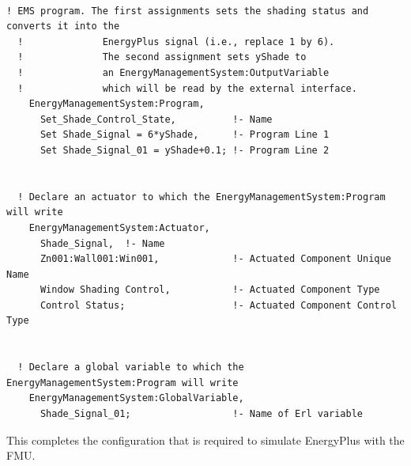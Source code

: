\begin{lstlisting}

! EMS program. The first assignments sets the shading status and converts it into the
  !              EnergyPlus signal (i.e., replace 1 by 6).
  !              The second assignment sets yShade to
  !              an EnergyManagementSystem:OutputVariable
  !              which will be read by the external interface.
    EnergyManagementSystem:Program,
      Set_Shade_Control_State,          !- Name
      Set Shade_Signal = 6*yShade,      !- Program Line 1
      Set Shade_Signal_01 = yShade+0.1; !- Program Line 2


  ! Declare an actuator to which the EnergyManagementSystem:Program will write
    EnergyManagementSystem:Actuator,
      Shade_Signal,  !- Name
      Zn001:Wall001:Win001,             !- Actuated Component Unique Name
      Window Shading Control,           !- Actuated Component Type
      Control Status;                   !- Actuated Component Control Type


  ! Declare a global variable to which the EnergyManagementSystem:Program will write
    EnergyManagementSystem:GlobalVariable,
      Shade_Signal_01;                  !- Name of Erl variable
\end{lstlisting}

This completes the configuration that is required to simulate EnergyPlus with the FMU.
